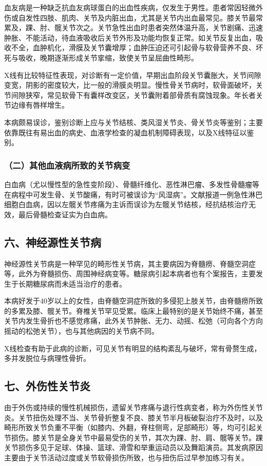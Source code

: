 血友病是一种缺乏抗血友病球蛋白的出血性疾病，仅发生于男性。患者常因轻微外伤或自发性四肢、肌肉、关节及内脏出血，尤其是关节内出血最常见。膝关节最常累及，踝、肘、髋关节次之。关节急性出血时患者突然体温升高，关节剧痛、迅速肿胀、不能活动，待血液吸收后关节外形及功能均恢复正常。如关节反复出血，吸收不全，血肿机化，滑膜及关节囊增厚；血肿压迫还可引起骨与软骨营养不良、坏死与吸收，晚期逐渐形成关节挛缩，致使关节呈屈曲性畸形。

X线有比较特征性表现，对诊断有一定价值，早期出血阶段关节囊胀大，关节间隙变宽，阴影的密度较大，比一般的滑膜炎明显。慢性骨关节病时，软骨面破坏，关节间隙狭窄，常见软骨下有囊样改变区，关节囊附着部骨质有腐蚀现象。年长者关节边缘有唇样增生。

本病颇易误诊，鉴别诊断上应与关节结核、类风湿关节炎、骨关节炎等鉴别；主要依靠既往有易出血的病史、血液学检查的凝血机制障碍表现，以及X线特征以鉴别。

\subsubsection{（二）其他血液病所致的关节病变}

白血病（尤以慢性型的急性变阶段）、骨髓纤维化、恶性淋巴瘤、多发性骨髓瘤等在病程中可发生骨、关节酸痛，有时可被误诊为“风湿病”。文献报道一例急性淋巴细胞白血病，因以左髋关节疼痛为主诉而误诊为左髋关节结核，经抗结核治疗无效，最后骨髓检查证实为白血病。

\subsection{六、神经源性关节病}

神经源性关节病是一种罕见的畸形性关节病，其主要病因为脊髓痨、脊髓空洞症等，此外为脊髓损伤、周围神经病变等。糖尿病引起本病者也有个案报告，主要发生于长期糖尿病而未适当治疗的患者。

本病好发于40岁以上的女性，由脊髓空洞症所致的多侵犯上肢关节，由脊髓痨所致的多累及膝、髋关节。脊椎关节罕见受累。临床上最特别的是关节始终不痛，甚至关节内发生骨折也不感觉疼痛，此外关节肿胀、无力、动摇、松弛（可向各个方向摇动的松弛关节），也与其他病因的关节病不同。

X线检查有助于此病的诊断，可见关节有明显的结构紊乱与破坏，常有骨赘生成，多并发脱位与病理性骨折。

\subsection{七、外伤性关节炎}

由于外伤或持续的慢性机械损伤，遗留关节疼痛与退行性病变者，称为外伤性关节炎。关节扭伤处理不当、关节骨折整复不良、膝关节半月板破裂治疗不及时，以及畸形所致关节负重不平衡（如膝内、外翻，脊柱侧弯，足部畸形）等，均可引起关节损伤。膝关节是全身关节中最易受伤的关节，其次为踝、肘、肩、髋等关节。踝关节损伤多见于足球、体操、篮球、滑雪和举重运动员以及舞蹈演员。其发病原因主要由于关节活动过度或关节软骨损伤所致，也与扭伤后过早参加练习有关。


